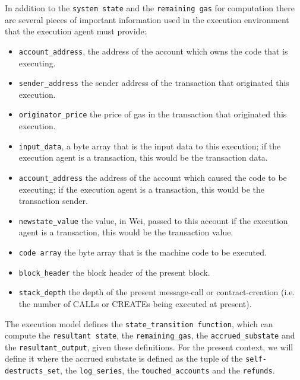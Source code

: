\documentclass[10pt,a4paper,leqno,bibliography=totoc]{scrartcl}
\newenvironment{alphafootnotes}
{\par\edef\savedfootnotenumber{\number\value{footnote}}
\renewcommand{\thefootnote}{\alph{footnote}}
\setcounter{footnote}{0}}
{\par\setcounter{footnote}{\savedfootnotenumber}}
\begin{document}
\begin{alphafootnotes}
\begin{multicols*}{2}
				In addition to the \texttt{system state} and the \texttt{remaining gas} for computation there are several pieces of important information used in the execution environment that the execution agent must provide:

				\begin{itemize}
					\item \texttt{account\_address}, the address of the account which owns the code that is executing.
					\item \texttt{sender\_address} the sender address of the transaction that originated this execution.
					\item \texttt{originator\_price} the price of gas in the transaction that originated this execution.
					\item \texttt{input\_data}, a byte array that is the input data to this execution; if the execution agent is a transaction, this would be the transaction data.
					\item \texttt{account\_address}  the address of the account which caused the code to be executing; if the execution agent is a transaction, this would be the transaction sender.
					\item \texttt{newstate\_value} the value, in Wei, passed to this account if the execution agent is a transaction, this would be the transaction value.\supercite{Wood2017}
					\item \texttt{code array} the byte array that is the machine code to be executed.\supercite{Wood2017}
					\item \texttt{block\_header} the block header of the present block.
					\item \texttt{stack\_depth} the depth of the present message-call or contract-creation (i.e. the number of {\small CALL}s or {\small CREATE}s being executed at present).\supercite{Wood2017}
				\end{itemize}

				The execution model defines the \texttt{state\_transition function}, which can compute the \texttt{resultant state}, the \texttt{remaining\_gas}, the \texttt{accrued\_substate} and the \texttt{resultant\_output}, given these definitions. For the present context, we will define it where the accrued substate is defined as the tuple of the \texttt{self-destructs\_set}, the \texttt{log\_series}, the \texttt{touched\_accounts} and the \texttt{refunds}.\supercite{Wood2017}


\end{multicols*}
\end{alphafootnotes}
\end{document}

